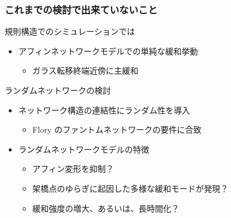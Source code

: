 \documentclass[12pt, dvipdfmx]{beamer}
\begin{document}
\begin{frame}
	\frametitle{これまでの検討で出来ていないこと}
		\begin{alertblock}{規則構造でのシミュレーションでは}
			\begin{itemize}
				\item アフィンネットワークモデルでの単純な緩和挙動 
				\begin{itemize}
					\item ガラス転移終端近傍に主緩和
				\end{itemize}
			\end{itemize}
		\end{alertblock}
		\begin{block}{ランダムネットワークの検討}
			\begin{itemize}
				\item ネットワーク構造の連結性にランダム性を導入
                    \begin{itemize}
						\item Flory のファントムネットワークの要件に合致
					\end{itemize}
				\item ランダムネットワークモデルの特徴
				\begin{itemize}
					\item アフィン変形を抑制？
					\item 架橋点のゆらぎに起因した多様な緩和モードが発現？
					\item 緩和強度の増大、あるいは、長時間化？
				\end{itemize}
			\end{itemize}
		\end{block}
\end{frame}
\end{document}
